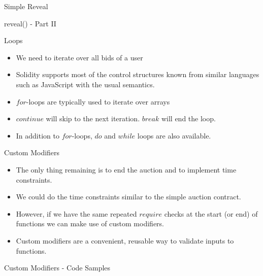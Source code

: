 \documentclass[]{beamer}
\begin{document}
\begin{frame}{Simple Reveal}
\vspace{.3cm}
	\begin{samplecode}{reveal() - Part II}
		
	\end{samplecode}
\end{frame}

\begin{frame}{Loops}
	\begin{itemize}
		\item<1->We need to iterate over all bids of a user
		\item<2->Solidity supports most of the control structures known from similar languages such as JavaScript with the usual semantics.
		\item<3->$for$-loops are typically used to iterate over arrays
		\item<5->$continue$ will skip to the next iteration. $break$ will end the loop.
		\item<6->In addition to $for$-loops, $do$ and $while$ loops are also available.
	\end{itemize}

	
\end{frame}

\begin{frame}{Custom Modifiers}
	\begin{itemize}
		\item<1-> The only thing remaining is to end the auction and to implement time constraints.
		\item<2-> We could do the time constraints similar to the simple auction contract.
		\item<3-> However, if we have the same repeated $require$ checks at the start (or end) of functions we can make use of custom modifiers.
		\item<4-> Custom modifiers are a convenient, reusable way to validate inputs to functions.
	\end{itemize}
\end{frame}

\begin{frame}{Custom Modifiers - Code Samples}
	\uncover<1->{
	\begin{samplecode}{Only Before}
		
	\end{samplecode}
	}
	\uncover<2->{
	\begin{samplecode}{Only After}
		
	\end{samplecode}
	}
\end{frame}
\end{document}
